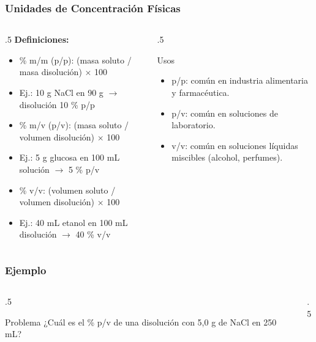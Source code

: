 \documentclass[11pt, aspectratio=169, xcolor=table]{beamer}
\begin{document}
\begin{frame}[allowdisplaybreaks]
	\frametitle{Unidades de Concentración Físicas}
	\begin{columns}
		\begin{column}{.5\textwidth}
			\textbf{Definiciones:}
			\begin{itemize}[<+->]
				\small
				\item \% m/m (p/p): (masa soluto / masa disolución) $\times$  100
				\item Ej.: 10 g NaCl en 90 g  $\rightarrow$ disolución 10 \% p/p
				\item \% m/v (p/v): (masa soluto / volumen disolución) $\times$ 100
				\item Ej.: 5 g glucosa en 100 mL solución $\rightarrow$ 5 \% p/v
				\item \% v/v: (volumen soluto / volumen disolución) $\times$ 100
				\item Ej.: 40 mL etanol en 100 mL disolución $\rightarrow$ 40 \% v/v
			\end{itemize}
		\end{column}

		\begin{column}{.5\textwidth}
			\begin{block}{Usos}
				\begin{itemize}[<+->]
					\item p/p: común en industria alimentaria y farmacéutica.
					\item p/v: común en soluciones de laboratorio.
					\item v/v: común en soluciones líquidas miscibles (alcohol, perfumes).
				\end{itemize}
			\end{block}
		\end{column}
	\end{columns}
\end{frame}

\begin{frame}[allowdisplaybreaks]
	\frametitle{Ejemplo}
	\begin{columns}
		\begin{column}{.5\textwidth}
			\begin{exampleblock}{Problema}
				¿Cuál es el \% p/v de una disolución con 5,0 g de NaCl en 250 mL?
			\end{exampleblock}
		\end{column}

		\begin{column}{.5\textwidth}

		\end{column}
	\end{columns}
\end{frame}
\end{document}
